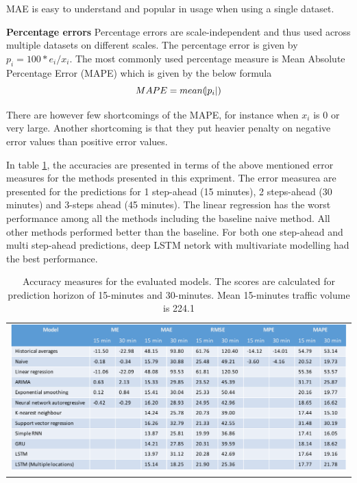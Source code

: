 MAE is easy to understand and popular in usage when using a single dataset.

\textbf{Percentage errors}
Percentage errors are scale-independent and thus used across multiple datasets on different
scales. The percentage error is given by $p_{i} = 100*e_{i}/x_{i}$. The most commonly used
percentage measure is Mean Absolute Percentage Error (MAPE) which is given by the below formula
    \begin{equation}
        MAPE = mean(\abs{p_{i}})
    \end{equation}

There are however few shortcomings of the MAPE, for instance when $x_{i}$ is 0 or very large.
Another shortcoming is that they put heavier penalty on negative error values than positive error
values.

In table \ref{table:accuracyScores}, the accuracies are presented in terms of the above mentioned
error measures for the methods presented in this expriment. The error measurea are presented for
the predictions for 1 step-ahead (15 minutes), 2 steps-ahead (30 minutes) and 3-steps ahead (45 minutes).
The linear regression has the worst performance among all the methods including the baseline naive
method. All other methods performed better than the baseline. For both one step-ahead and multi
step-ahead predictions, deep LSTM netork with multivariate modelling had the best performance.

\begin{table}
    \begin{tabular}{c}
        \includegraphics[width=\textwidth,height=\textheight,keepaspectratio]{Figures/errors-table.pdf}
    \end{tabular}
    \caption[Model comparisons]{Accuracy measures for the evaluated models. The scores are
    calculated for prediction horizon of 15-minutes and 30-minutes. Mean 15-minutes traffic
    volume is 224.1}
    \label{table:accuracyScores}
\end{table}


